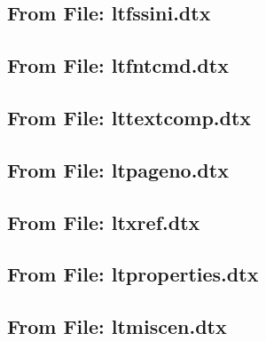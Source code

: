 \documentclass{l3in2edoc}
\begin{document}

\subsection{From File: ltfssini.dtx}





\subsection{From File: ltfntcmd.dtx}

\leavevmode


\subsection{From File: lttextcomp.dtx}

\leavevmode


\subsection{From File: ltpageno.dtx}

\leavevmode


\subsection{From File: ltxref.dtx}

\leavevmode


\subsection{From File: ltproperties.dtx}

\leavevmode


\subsection{From File: ltmiscen.dtx}


\end{document}
